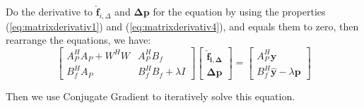 \documentclass[12pt]{article}
\numberwithin{equation}{section}
\begin{document}
{Do the derivative to $\hat{\bm {f}}_{i, \Delta}$ and $\bm{\Delta p}$ for the equation by using the properties (\ref{eq:matrixderivativ1}) and (\ref{eq:matrixderivativ4}), and equals them to zero, then rearrange the equations, we have:
\begin{equation}
	\begin{bmatrix}
		A^H_PA_P+W^HW & A^H_PB_f \\
		B^H_fA_P			& B^H_fB_f+\lambda I
	\end{bmatrix}
	\begin{bmatrix}
		\bm{\hat{f}_{i, \Delta}} \\
		\bm{\Delta p}
	\end{bmatrix}
	=
	\begin{bmatrix}
		A^H_P\bm{\hat{y}} \\
		B^H_f\bm{\hat{y}} -\lambda \bm{p}
	\end{bmatrix}
\end{equation} \par
Then we use Conjugate Gradient to iteratively solve this equation. 
}
\end{document}
